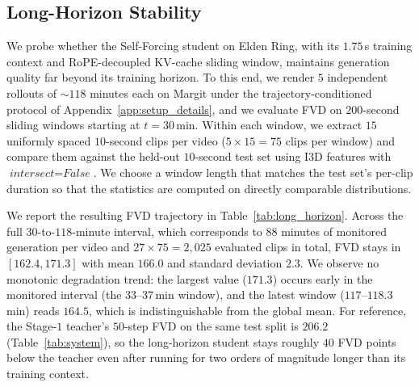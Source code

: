 \subsection{Long-Horizon Stability}
\label{app:long_horizon}

We probe whether the Self-Forcing student on Elden Ring, with its $1.75$\,s training context and RoPE-decoupled KV-cache sliding window, maintains generation quality far beyond its training horizon. To this end, we render $5$ independent rollouts of ${\sim}118$ minutes each on Margit under the trajectory-conditioned protocol of Appendix~\ref{app:setup_details}, and we evaluate FVD on $200$-second sliding windows starting at $t=30$\,min. Within each window, we extract $15$ uniformly spaced $10$-second clips per video ($5\times 15=75$ clips per window) and compare them against the held-out $10$-second test set using I$3$D features with $\textit{intersect}=\textit{False}$. We choose a window length that matches the test set's per-clip duration so that the statistics are computed on directly comparable distributions.

We report the resulting FVD trajectory in Table~\ref{tab:long_horizon}. Across the full $30$-to-$118$-minute interval, which corresponds to $88$ minutes of monitored generation per video and $27\times 75=2{,}025$ evaluated clips in total, FVD stays in $[162.4, 171.3]$ with mean $166.0$ and standard deviation $2.3$. We observe no monotonic degradation trend: the largest value ($171.3$) occurs early in the monitored interval (the $33$--$37$\,min window), and the latest window ($117$--$118.3$\,min) reads $164.5$, which is indistinguishable from the global mean. For reference, the Stage-$1$ teacher's $50$-step FVD on the same test split is $206.2$ (Table~\ref{tab:system}), so the long-horizon student stays roughly $40$ FVD points below the teacher even after running for two orders of magnitude longer than its training context.

